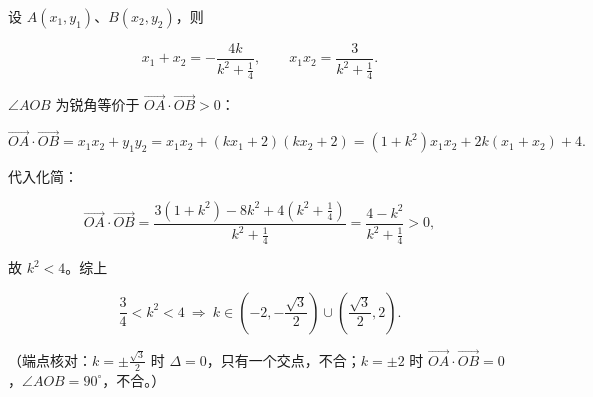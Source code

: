 \begin{answer}
设 $A(x_1,y_1)$、$B(x_2,y_2)$，则

\nopagebreak[4]
\[x_1+x_2=-\frac{4k}{k^2+\frac14},\qquad x_1x_2=\frac{3}{k^2+\frac14}.\]

$\angle AOB$ 为锐角等价于 $\overrightarrow{OA}\cdot\overrightarrow{OB}>0$：

\nopagebreak[4]
\[\overrightarrow{OA}\cdot\overrightarrow{OB}=x_1x_2+y_1y_2
=x_1x_2+(kx_1+2)(kx_2+2)
=(1+k^2)x_1x_2+2k(x_1+x_2)+4 .\]

代入化简：

\nopagebreak[4]
\[\overrightarrow{OA}\cdot\overrightarrow{OB}
=\frac{3(1+k^2)-8k^2+4\left(k^2+\frac14\right)}{k^2+\frac14}
=\frac{4-k^2}{k^2+\frac14}>0,\]

故 $k^2<4$。综上

\nopagebreak[4]
\[\frac34<k^2<4\ \Longrightarrow\ k\in\left(-2,-\frac{\sqrt3}{2}\right)\cup\left(\frac{\sqrt3}{2},2\right).\]

（端点核对：$k=\pm\frac{\sqrt3}{2}$ 时 $\Delta=0$，只有一个交点，不合；$k=\pm2$ 时 $\overrightarrow{OA}\cdot\overrightarrow{OB}=0$，$\angle AOB=90^\circ$，不合。）


\end{answer}
